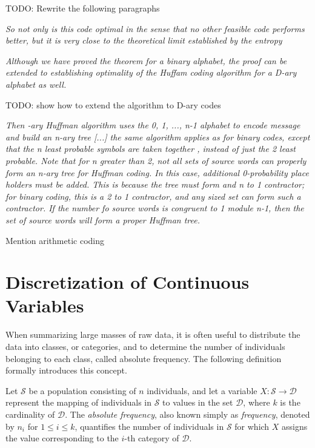 {\color{red} TODO: Rewrite the following paragraphs}

\emph{So not only is this code optimal in the sense that no other feasible code performs better, but it is very close to the theoretical limit established by the entropy}

\emph{Although we have proved the theorem for a binary alphabet, the proof can be extended to establishing optimality of the Huffam coding algorithm for a D-ary alphabet as well.}

{\color{red} TODO: show how to extend the algorithm to D-ary codes}

\emph{Then -ary Huffman algorithm uses the {0, 1, ..., n-1} alphabet to encode message and build an n-ary tree [...] the same algorithm applies as for binary codes, except that the n least probable symbols are taken together , instead of just the 2 least probable. Note that for n greater than 2, not all sets of source words  can properly form an n-ary tree for Huffman coding. In this case, additional 0-probability place holders must be added. This is because the tree must form and n to 1 contractor; for binary coding, this is a 2 to 1 contractor, and any sized set can form such a contractor. If the number fo source words is congruent to 1 module n-1, then the set of source words will form a proper Huffman tree.}

{\color{red} Mention arithmetic coding}

%
%

\section{Discretization of Continuous Variables}
\label{sec:discretization_continuous_variables}

When summarizing large masses of raw data, it is often useful to distribute the data into classes, or categories, and to determine the number of individuals belonging to each class, called absolute frequency. The following definition formally introduces this concept.

\begin{definition}
Let $\mathcal{S}$ be a population consisting of $n$ individuals, and let a variable $X: \mathcal{S} \rightarrow \mathcal{D}$ represent the mapping of individuals in $\mathcal{S}$ to values in the set $\mathcal{D}$, where $k$ is the cardinality of $\mathcal{D}$. The \emph{absolute frequency}, also known simply as \emph{frequency}, denoted by $n_i$ for $1 \leq i \leq k$, quantifies the number of individuals in $\mathcal{S}$ for which $X$ assigns the value corresponding to the $i$-th category of $\mathcal{D}$.
\end{definition}

